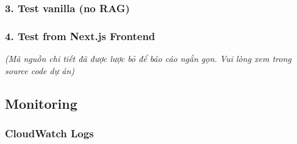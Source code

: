 \begin{Shaded}
\begin{Highlighting}[]
  \DataTypeTok{\textbackslash{}}
    \DataTypeTok{\textbackslash{}}
   \StringTok{\textquotesingle{}\{}
\StringTok{  \}\textquotesingle{}} \KeywordTok{|} 
\end{Highlighting}
\end{Shaded}

\hypertarget{test-vanilla-no-rag}{%
\subsubsection{3. Test vanilla (no RAG)}}

\begin{Shaded}
\begin{Highlighting}[]
  \DataTypeTok{\textbackslash{}}
    \DataTypeTok{\textbackslash{}}
   \StringTok{\textquotesingle{}\{}
\StringTok{  \}\textquotesingle{}} \KeywordTok{|} 
\end{Highlighting}
\end{Shaded}

\hypertarget{test-from-next.js-frontend}{%
\subsubsection{4. Test from Next.js
Frontend}}

\emph{(Mã nguồn chi tiết đã được lược bỏ để báo cáo ngắn gọn. Vui lòng
xem trong source code dự án)}

\hypertarget{monitoring}{%
\subsection{Monitoring}}

\hypertarget{cloudwatch-logs}{%
\subsubsection{CloudWatch Logs}}

